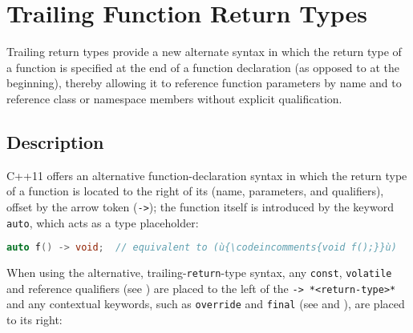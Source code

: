 \newpage
\section[Trailing Return]{Trailing Function Return Types}\label{trailing-function-return-types}


Trailing return types provide a new alternate syntax in which the return type of a function is specified at
the end of a function declaration (as opposed to at the beginning),
thereby allowing it to reference function parameters by name and to reference class
or namespace members without explicit qualification.

\subsection[Description]{Description}\label{description}

C++11 offers an alternative function-declaration syntax in which the
return type of a function is located to the right of its
 (name, parameters, and qualifiers), offset by the
arrow token (\lstinline!->!); the function itself is introduced by the
keyword \lstinline!auto!, which acts as a type placeholder:
%

\begin{lstlisting}[language=C++]
auto f() -> void;  // equivalent to (ù{\codeincomments{void f();}}ù)
\end{lstlisting}

When using the alternative, trailing-\lstinline!return!-type syntax, any \lstinline!const!,
\lstinline!volatile! and reference qualifiers (see
) are placed to the left of
the \lstinline!->!~\lstinline!*<return-type>*! and any contextual keywords, such as
\lstinline!override! and \lstinline!final! (see
and
), are placed to its right:

